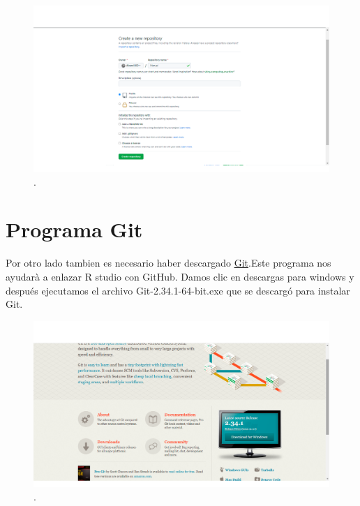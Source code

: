 \documentclass[
  11pt,
  spanish,
  oneside]{book}
\begin{document}
\begin{figure}

{\centering \includegraphics[width=1\linewidth]{imagenes/Imagen 2} 

}

\caption{.}\label{fig:unnamed-chunk-2}
\end{figure}

\hypertarget{programa-git}{%
\section*{Programa Git}\label{programa-git}}

Por otro lado tambien es necesario haber descargado \href{https://git-scm.com/}{Git}.Este programa nos ayudarà a enlazar R studio con GitHub. Damos clic en descargas para windows y después ejecutamos el archivo Git-2.34.1-64-bit.exe que se descargó para instalar Git.

\begin{figure}

{\centering \includegraphics[width=1\linewidth]{imagenes/Imagen 3} 

}

\caption{.}\label{fig:unnamed-chunk-3}
\end{figure}
\end{document}
